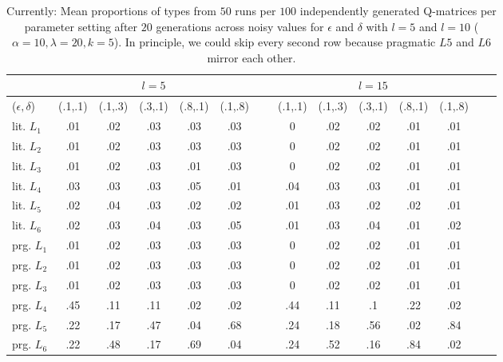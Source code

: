 \documentclass[a4paper]{article}
\newcommand{\hl}[1]{\textcolor[rgb]{.8,.33,.0}{#1}}%
\begin{document}
\begin{table}
\centering 
\begin{tabular}{l | c c c c c| c c c c c c c c}
\multicolumn{1}{c}{~} & \multicolumn{5}{c}{$l = 5$} & ~ & \multicolumn{5}{c}{$l = 15$}\\ \hline \hline
 ($\epsilon,\delta$)        &  (.1,.1)  & (.1,.3)  & (.3,.1)  & (.8,.1)  & (.1,.8) & ~ & (.1,.1) & (.1,.3) & (.3,.1) & (.8,.1) & (.1,.8)\\ \hline \hline
lit. $L_1$ & .01 & .02 & .03 & .03 & .03& ~ & 0& .02&  .02 & .01 & .01\\ 
lit. $L_2$ & .01 & .02 & .03 & .03 & .03& ~ & 0& .02&  .02 & .01 & .01\\
lit. $L_3$ & .01 & .02 & .03 & .01 & .03& ~ & 0& .02 & .02 & .01 & .01\\
lit. $L_4$ & .03 & .03 & .03 & .05 & .01& ~ & .04& .03 & .03 & .01 & .01\\
lit. $L_5$ & .02 & .04 & .03 & .02 & .02& ~ & .01& .03 & .02 & .02 & .01\\
lit. $L_6$ & .02 & .03 & .04 & .03 & .05& ~ & .01& .03 & .04 & .01 & .02\\ \hline
prg. $L_1$ & .01 & .02 & .03 & .03 & .03& ~ & 0&  .02& .02 & .01 &  .01\\
prg. $L_2$ & .01 & .02 & .03 & .03 & .03& ~ & 0&  .02& .02& .01&  .01\\
prg. $L_3$ & .01 & .02 & .03 & .03 & .03& ~ & 0&  .02& .02 & .01 & .01 \\ 
prg. $L_4$ & .45 & .11 & .11 & .02 & .02& ~ & .44& .11 & .1 & .22 & .02 \\
prg. $L_5$ & .22 & .17 & .47 & .04 & .68& ~ & .24& .18 & .56 & .02 & .84\\
prg. $L_6$ & .22 & .48 & .17 & .69 & .04& ~ & .24& .52 & .16 & .84 & .02
\end{tabular}
\caption{\hl{Currently: Mean proportions of types from $50$ runs per $100$ independently generated Q-matrices per parameter setting after $20$ generations across noisy values for $\epsilon$ and $\delta$ with $l = 5$ and $l = 10$ ($\alpha = 10, \lambda = 20, k = 5$). In principle, we could skip every second row because pragmatic $L5$ and $L6$ mirror each other.}}
\label{tab:num-noise}
\end{table}
\end{document}
